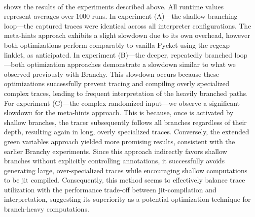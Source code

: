 
    \paragraph{}%
       shows the results of the experiments described above. All runtime values represent averages over 1000 runs. In experiment (A)—the shallow branching loop—the captured traces were identical across all interpreter configurations. The meta-hints approach exhibits a slight slowdown due to its own overhead, however both optimizations perform comparably to vanilla Pycket using the regexp linklet, as anticipated. In experiment (B)—the deeper, repeatedly branched loop—both optimization approaches demonstrate a slowdown similar to what we observed previously with Branchy. This slowdown occurs because these optimizations successfully prevent tracing and compiling overly specialized complex traces, leading to frequent interpretation of the heavily branched paths. For experiment (C)—the complex randomized input—we observe a significant slowdown for the meta-hints approach. This is because, once  is activated by shallow branches, the tracer subsequently follows all branches regardless of their depth, resulting again in long, overly specialized traces. Conversely, the extended green variables approach yielded more promising results, consistent with the earlier Branchy experiments. Since this approach indirectly favors shallow branches without explicitly controlling  annotations, it successfully avoids generating large, over-specialized traces while encouraging shallow computations to be \gls{jit} compiled. Consequently, this method seems to effectively balance trace utilization with the performance trade-off between \gls{jit}-compilation and interpretation, suggesting its superiority as a potential optimization technique for branch-heavy computations.

